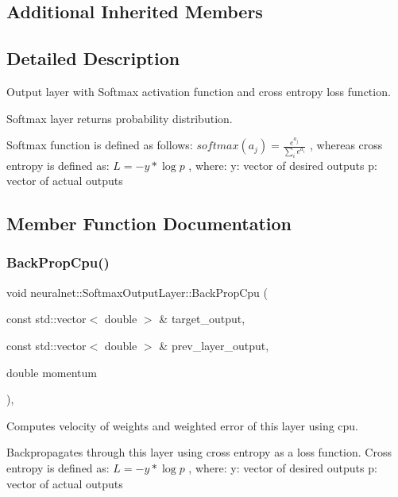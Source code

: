 \subsection*{Additional Inherited Members}


\subsection{Detailed Description}
Output layer with Softmax activation function and cross entropy loss function. 

Softmax layer returns probability distribution.

Softmax function is defined as follows\+: $softmax(a_{j}) = \frac{e^{a_{j}}}{\sum_{i}e^{a_{i}}} $ , whereas cross entropy is defined as\+: $L = -y * \log{p} $ , where\+: y\+: vector of desired outputs p\+: vector of actual outputs 

\subsection{Member Function Documentation}
\mbox{\label{classneuralnet_1_1SoftmaxOutputLayer_a7360169d36832228b4938f9ff469bb59}} 
\subsubsection{\texorpdfstring{Back\+Prop\+Cpu()}{BackPropCpu()}}
{\footnotesize\ttfamily void neuralnet\+::\+Softmax\+Output\+Layer\+::\+Back\+Prop\+Cpu (\begin{DoxyParamCaption}\item[{const std\+::vector$<$ double $>$ \&}]{target\+\_\+output,  }\item[{const std\+::vector$<$ double $>$ \&}]{prev\+\_\+layer\+\_\+output,  }\item[{double}]{momentum }\end{DoxyParamCaption})\hspace{0.3cm}{\ttfamily [protected]}, {\ttfamily [virtual]}}



Computes velocity of weights and weighted error of this layer using cpu. 

Backpropagates through this layer using cross entropy as a loss function. Cross entropy is defined as\+: $L = -y * \log{p} $ , where\+: y\+: vector of desired outputs p\+: vector of actual outputs

